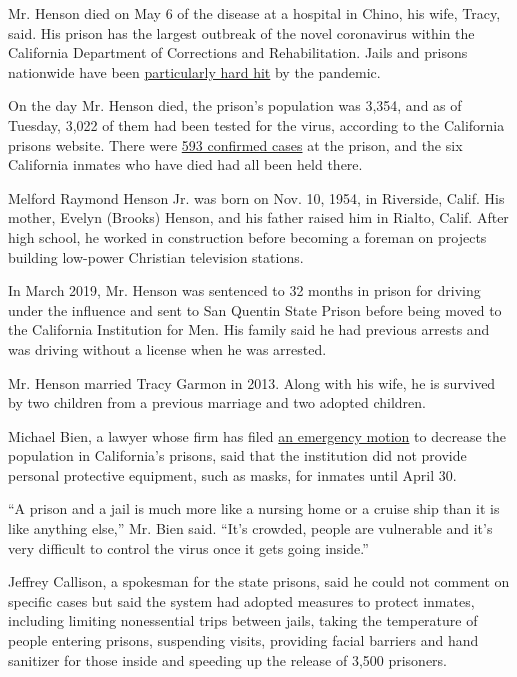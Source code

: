 Mr. Henson died on May 6 of the disease at a hospital in Chino, his
wife, Tracy, said. His prison has the largest outbreak of the novel
coronavirus within the California Department of Corrections and
Rehabilitation. Jails and prisons nationwide have been
\href{https://www.nytimes.com/2020/03/30/us/coronavirus-prisons-jails.html}{particularly
hard hit} by the pandemic.

On the day Mr. Henson died, the prison's population was 3,354, and as of
Tuesday, 3,022 of them had been tested for the virus, according to the
California prisons website. There were
\href{https://www.cdcr.ca.gov/covid19/population-status-tracking/}{593
confirmed cases} at the prison, and the six California inmates who have
died had all been held there.

Melford Raymond Henson Jr. was born on Nov. 10, 1954, in Riverside,
Calif. His mother, Evelyn (Brooks) Henson, and his father raised him in
Rialto, Calif. After high school, he worked in construction before
becoming a foreman on projects building low-power Christian television
stations.

In March 2019, Mr. Henson was sentenced to 32 months in prison for
driving under the influence and sent to San Quentin State Prison before
being moved to the California Institution for Men. His family said he
had previous arrests and was driving without a license when he was
arrested.

Mr. Henson married Tracy Garmon in 2013. Along with his wife, he is
survived by two children from a previous marriage and two adopted
children.

Michael Bien, a lawyer whose firm has filed
\href{https://rbgg.com/wp-content/uploads/Emergency-Motion-Coleman-and-Plata-Three-Judge-Court-Dkt-No-6522-filed-2020-03-25.pdf}{an
emergency motion} to decrease the population in California's prisons,
said that the institution did not provide personal protective equipment,
such as masks, for inmates until April 30.

``A prison and a jail is much more like a nursing home or a cruise ship
than it is like anything else,'' Mr. Bien said. ``It's crowded, people
are vulnerable and it's very difficult to control the virus once it gets
going inside.''

Jeffrey Callison, a spokesman for the state prisons, said he could not
comment on specific cases but said the system had adopted measures to
protect inmates, including limiting nonessential trips between jails,
taking the temperature of people entering prisons, suspending visits,
providing facial barriers and hand sanitizer for those inside and
speeding up the release of 3,500 prisoners.

